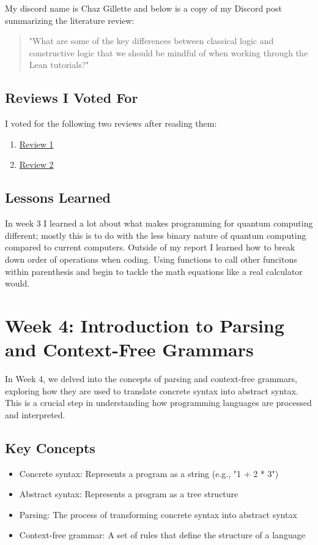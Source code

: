 \documentclass{article}
\begin{document}
My discord name is Chaz Gillette and below is a copy of my Discord post summarizing the literature review:

\begin{quote}
\small
"What are some of the key differences between classical logic and constructive logic that we should be mindful of when working through the Lean tutorials?"
\end{quote}

\subsection*{Reviews I Voted For}
I voted for the following two reviews after reading them:

\begin{enumerate}
    \item \href{https://github.com/mdrivas/CPSC353-Assignment3/blob/main/README.md}{Review 1}
    \item \href{https://github.com/ATacoDev/LitReview354}{Review 2}
\end{enumerate}

\subsection*{Lessons Learned}
In week 3 I learned a lot about what makes programming for quantum computing different; mostly this is to do with the less binary nature of quantum computing compared to current computers. Outside of my report I learned how to break down order of operations when coding. Using functions to call other funcitons within parenthesis and begin to tackle the math equations like a real calculator would. 

\section{Week 4: Introduction to Parsing and Context-Free Grammars}
\label{sec:week4}

In Week 4, we delved into the concepts of parsing and context-free grammars, exploring how they are used to translate concrete syntax into abstract syntax. This is a crucial step in understanding how programming languages are processed and interpreted.

\subsection*{Key Concepts}

\begin{itemize}
    \item Concrete syntax: Represents a program as a string (e.g., "1 + 2 * 3")
    \item Abstract syntax: Represents a program as a tree structure
    \item Parsing: The process of transforming concrete syntax into abstract syntax
    \item Context-free grammar: A set of rules that define the structure of a language
\end{itemize}
\end{document}
